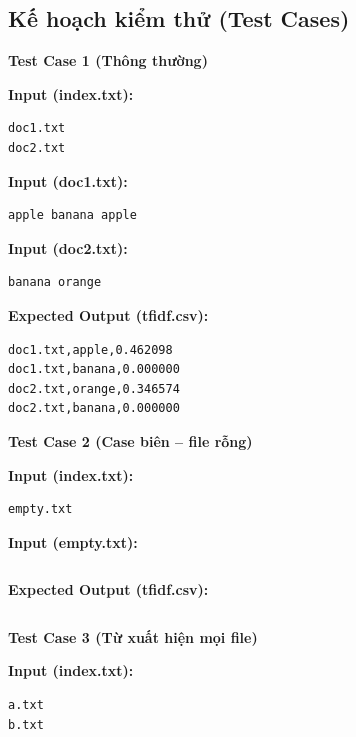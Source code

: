 \subsection{Kế hoạch kiểm thử (Test Cases)}

\textbf{Test Case 1 (Thông thường)}

\textbf{Input (index.txt):}

\begin{lstlisting}
doc1.txt
doc2.txt
\end{lstlisting}

\textbf{Input (doc1.txt):}

\begin{lstlisting}
apple banana apple
\end{lstlisting}

\textbf{Input (doc2.txt):}

\begin{lstlisting}
banana orange
\end{lstlisting}

\textbf{Expected Output (tfidf.csv):}

\begin{lstlisting}
doc1.txt,apple,0.462098
doc1.txt,banana,0.000000
doc2.txt,orange,0.346574
doc2.txt,banana,0.000000
\end{lstlisting}

\vspace{0.5cm}

\textbf{Test Case 2 (Case biên -- file rỗng)}

\textbf{Input (index.txt):}

\begin{lstlisting}
empty.txt
\end{lstlisting}

\textbf{Input (empty.txt):}

\begin{lstlisting}

\end{lstlisting}

\textbf{Expected Output (tfidf.csv):}

\begin{lstlisting}

\end{lstlisting}

\vspace{0.5cm}

\textbf{Test Case 3 (Từ xuất hiện mọi file)}

\textbf{Input (index.txt):}

\begin{lstlisting}
a.txt
b.txt
\end{lstlisting}

